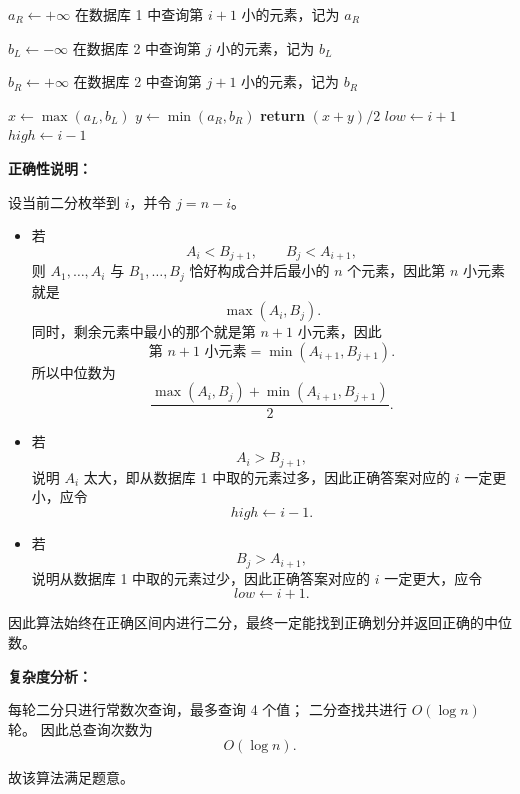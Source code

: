 ﻿\documentclass[12pt,a4paper]{article}
\begin{document}
\begin{answerbox}
\begin{algorithm}[H]
\begin{algorithmic}[1]
        \STATE $a_R \leftarrow +\infty$
    \ELSE
        \STATE 在数据库 1 中查询第 $i+1$ 小的元素，记为 $a_R$
    \ENDIF
    
        \STATE $b_L \leftarrow -\infty$
    \ELSE
        \STATE 在数据库 2 中查询第 $j$ 小的元素，记为 $b_L$
    \ENDIF
    
        \STATE $b_R \leftarrow +\infty$
    \ELSE
        \STATE 在数据库 2 中查询第 $j+1$ 小的元素，记为 $b_R$
    \ENDIF
    
            \STATE $x \leftarrow \max(a_L,b_L)$
            \STATE $y \leftarrow \min(a_R,b_R)$
            \STATE \textbf{return} $(x+y)/2$
        \ELSE
            \STATE $low \leftarrow i+1$
        \ENDIF
    \ELSE
        \STATE $high \leftarrow i-1$
    \ENDIF
\ENDWHILE
\end{algorithmic}
\end{algorithm}

\textbf{正确性说明：}

设当前二分枚举到 $i$，并令 $j=n-i$。

\begin{itemize}
    \item 若
    \[
    A_i < B_{j+1}, \qquad B_j < A_{i+1},
    \]
    则 $A_1,\dots,A_i$ 与 $B_1,\dots,B_j$ 恰好构成合并后最小的 $n$ 个元素，因此第 $n$ 小元素就是
    \[
    \max(A_i,B_j).
    \]
    同时，剩余元素中最小的那个就是第 $n+1$ 小元素，因此
    \[
    \text{第 } n+1 \text{ 小元素}=\min(A_{i+1},B_{j+1}).
    \]
    所以中位数为
    \[
    \frac{\max(A_i,B_j)+\min(A_{i+1},B_{j+1})}{2}.
    \]

    \item 若
    \[
    A_i > B_{j+1},
    \]
    说明 $A_i$ 太大，即从数据库 1 中取的元素过多，因此正确答案对应的 $i$ 一定更小，应令
    \[
    high \leftarrow i-1.
    \]

    \item 若
    \[
    B_j > A_{i+1},
    \]
    说明从数据库 1 中取的元素过少，因此正确答案对应的 $i$ 一定更大，应令
    \[
    low \leftarrow i+1.
    \]
\end{itemize}

因此算法始终在正确区间内进行二分，最终一定能找到正确划分并返回正确的中位数。

\textbf{复杂度分析：}

每轮二分只进行常数次查询，最多查询 4 个值；
二分查找共进行 $O(\log n)$ 轮。
因此总查询次数为
\[
O(\log n).
\]

故该算法满足题意。

\end{answerbox}
\end{document}
